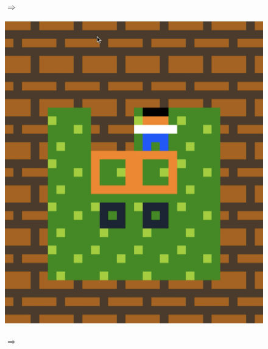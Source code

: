 \begin{figure}[!htbp]
\begin{minipage}[t]{0.2\textwidth}
\end{minipage}
$\Longrightarrow$
\begin{minipage}[t]{0.2\textwidth}
\includegraphics[width=\textwidth]{figures/maxii2.png} \hfill \\
\end{minipage}
$\Longrightarrow$
\begin{minipage}[t]{0.2\textwidth}

\end{minipage}
\end{figure}
